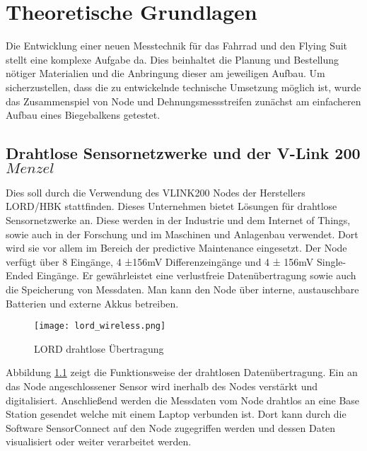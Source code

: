 \chapter{Theoretische Grundlagen}
Die Entwicklung einer neuen Messtechnik für das Fahrrad und den Flying Suit stellt eine komplexe Aufgabe da.
Dies beinhaltet die Planung und Bestellung nötiger Materialien und die Anbringung dieser am jeweiligen Aufbau.
Um sicherzustellen, dass die zu entwickelnde technische Umsetzung möglich ist, wurde das Zusammenspiel von Node und Dehnungsmessstreifen zunächst am einfacheren Aufbau eines Biegebalkens getestet.



\section{Drahtlose Sensornetzwerke und der V-Link 200 \(Menzel\)}

Dies soll durch die Verwendung des VLINK200 Nodes der Herstellers LORD/HBK stattfinden.
Dieses Unternehmen bietet Lösungen für drahtlose Sensornetzwerke an. Diese werden in der Industrie und dem Internet of Things, sowie auch in der Forschung und im Maschinen und Anlagenbau verwendet.
Dort wird sie vor allem im Bereich der predictive Maintenance eingesetzt.
Der Node verfügt über 8 Eingänge, 4 ±156mV Differenzeingänge und 4 ± 156mV Single-Ended Eingänge.
Er gewährleistet eine verlustfreie Datenübertragung sowie auch die Speicherung von Messdaten.
Man kann den Node über interne, austauschbare Batterien und externe Akkus betreiben.

\begin{figure}[h]
    \begin{center}
        \texttt{[image: lord\_wireless.png]}
        \caption[LORD drahtlose Übertragung (Abbildungsverzeichnis)]{LORD drahtlose Übertragung
        \cite{VLInkManual}
        }
        \label{fig:lordwireless}
    \end{center}
\end{figure}

Abbildung \ref{fig:lordwireless} zeigt die Funktionsweise der drahtlosen Datenübertragung.
Ein an das Node angeschlossener Sensor wird inerhalb des Nodes verstärkt und digitalisiert.
Anschließend werden die Messdaten vom Node drahtlos an eine Base Station gesendet welche mit einem Laptop verbunden ist.
Dort kann durch die Software SensorConnect auf den Node zugegriffen werden und dessen Daten visualisiert oder weiter verarbeitet werden.


